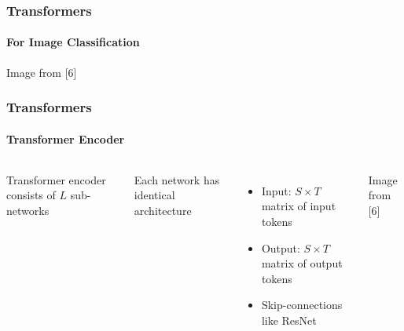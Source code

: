 \documentclass[xetex,professionalfont]{beamer}
\renewcommand\emph[1]{\textcolor{tuwcvl_cvl_blue}{#1}}
\begin{document}
\begin{frame}
	\frametitle{Transformers}
	\framesubtitle{For Image Classification}

	\begin{center}
		{\centering Image from [6]}
	\end{center}

\end{frame}


\begin{frame}
	\frametitle{Transformers}
	\framesubtitle{Transformer Encoder}

	\begin{columns}

		\emph{Transformer encoder} consists of $L$ sub-networks

		\bigskip

		Each network has identical architecture
		\begin{itemize}
			\item Input: $S\times T$ matrix of input tokens  %
			\item Output: $S\times T$ matrix of output tokens
			\item Skip-connections like ResNet
		\end{itemize}


		\begin{center}
			{\centering Image from [6]}
		\end{center}

	\end{columns}

\end{frame}
\end{document}
